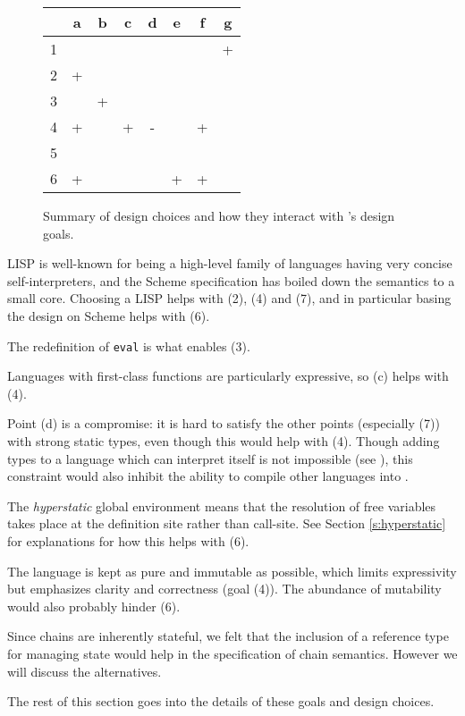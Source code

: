 \begin{figure}[H]
\small
\begin{tabular}{l|ccccccc}
    & a & b & c & d & e & f & g\\
  \hline
  1 &   &   &   &   &   &   & + \\
  2 & + &   &   &   &   &   & \\
  3 &   & +\\
  4 & + &   & + & - &   & +\\
  5 & \\
  6 & + &   &   &   & + & +
\end{tabular}
\normalsize
\caption{Summary of design choices and how they interact with \rad{}'s design goals.}
\end{figure}

LISP is well-known for being a high-level family of languages having very concise
self-interpreters, and the Scheme specification has boiled down the
semantics to a small core. Choosing a LISP helps with (2), (4) and (7), and in
particular basing the design on Scheme helps with (6).

The redefinition of \texttt{eval} is what enables (3).

Languages with first-class functions are particularly expressive, so (c) helps
with (4).


Point (d) is a compromise: it is hard to satisfy the other points (especially
(7)) with strong static types, even though this would help with (4). Though
adding types to a language which can interpret itself is not impossible (see
\cite{brown-papers}), this constraint would also inhibit the ability to
compile other languages into \rad{}.

The \emph{hyperstatic} global environment means that the resolution of free
variables takes place at the definition site rather than call-site. See Section
\ref{s:hyperstatic} for explanations for how this helps with (6).

The language is kept as pure and immutable as possible, which limits
expressivity but emphasizes clarity and correctness (goal (4)). The abundance of
mutability would also probably hinder (6).

Since chains are inherently stateful, we felt that the inclusion of a reference
type for managing state would help in the specification of chain semantics.
However we will discuss the alternatives.

The rest of this section goes into the details of these goals and
design choices.


